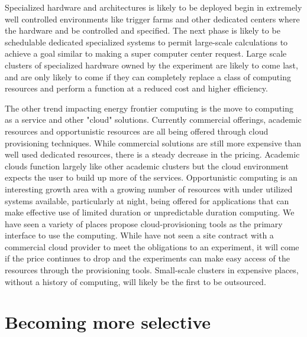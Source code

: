 Specialized hardware and architectures is likely to be deployed begin in extremely well controlled environments like trigger farms and other dedicated centers where the hardware and be controlled and specified.    The next phase is likely to be schedulable dedicated specialized systems to permit large-scale calculations to achieve a goal similar to making a super computer center request.   Large scale clusters of specialized hardware owned by the experiment are likely to come last, and are only likely to come if they can completely replace a class of computing resources and perform a function at a reduced cost and higher efficiency.    

The other trend impacting energy frontier computing is the move to computing as a service and other "cloud" solutions.    Currently commercial offerings, academic resources and opportunistic resources are all being offered through cloud provisioning techniques.    While commercial solutions are still more expensive than well used dedicated resources, there is a steady decrease in the pricing.   Academic clouds function largely like other academic clusters but the cloud environment expects the user to build up more of the services.   Opportunistic computing is an interesting growth area with a growing number of resources with under utilized systems available, particularly at night, being offered for applications that can make effective use of limited duration or unpredictable duration computing.    We have seen a variety of places propose cloud-provisioning tools as the primary interface to use the computing. While have not seen a site contract with a commercial cloud provider to meet the obligations to an experiment, it will come if the price continues to drop and the experiments can make easy access of the resources through the provisioning tools.   Small-scale clusters in expensive places, without a history of computing, will likely be the first to be outsourced.   

\section{Becoming more selective}
\label{sec:comp-select}

